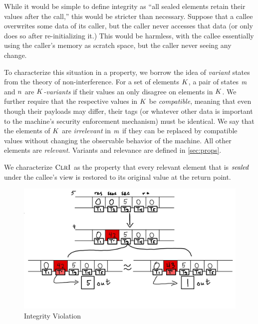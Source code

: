 \documentclass[10pt,conference]{ieeetran}%
\theoremstyle{definition}
\begin{document}
While it would be simple to define integrity as ``all sealed elements retain their
values after the call,'' this would be stricter than necessary. Suppose that
a callee overwrites some data of its caller, but the caller never accesses that data
(or only does so after re-initializing it.) This would be harmless, with the callee
essentially using the caller's memory as scratch space, but the caller never seeing any change.

To characterize this situation in a property, we borrow the idea of \emph{variant} states
from the theory of non-interference. For a set of elements \(K\),
a pair of states \(m\) and \(n\) are {\em \(K\)-variants} if
their values an only disagree on elements in \(K\). We further require that
the respective values in \(K\) be \emph{compatible}, meaning that even though
their payloads may differ, their tags (or whatever other data is important to
the machine's security enforcement mechanism) must be identical.
We say that the elements of \(K\) are \emph{irrelevant}
in \(m\) if they can be replaced by compatible values without changing the
observable behavior of the machine. All other elements are \emph{relevant}.
Variants and relevance are defined in \cref{sec:props}.

We characterize \(\textnormal{\sc ClrI}\) as the property that
every relevant element that is \(\mathit{sealed}\) under the callee's view is restored
to its original value at the return point.

\begin{figure}
  \includegraphics[width=\columnwidth]{variants.png}
  \caption{Integrity Violation}
  \label{fig:variant}
\end{figure}
\end{document}
